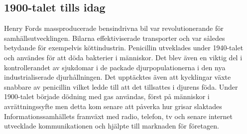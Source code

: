 \subsection{1900-talet tills idag}
Henry Fords massproducerade bensindrivna bil var revolutionerande för samhällsutvecklingen. Bilarna effektiviserade transporter och var således betydande för exempelvis köttindustrin. \citep{denskapande}
\newline
\newline
Penicillin utveklades under 1940-talet och användes för att döda bakterier i människor. Det blev även en viktig del i kontrollerandet av sjukdomar i de packade djurpopulationerna i den nya industrialiserade djurhållningen. Det upptäcktes även att kycklingar växte snabbare av penicillin vilket ledde till att det tillsattes i djurens föda. \citep{denskapande}
\newline
\newline
Under 1900-talet började dödning med gas användas, först på människor i avrättningssyfte men detta kom senare att påverka hur grisar slaktades \citep{denskapande}
\newline
\newline
Informationssamhällets framväxt med radio, telefon, tv och senare internet utvecklade kommunikationen och hjälpte till marknaden för företagen. \citep{kommunikation}